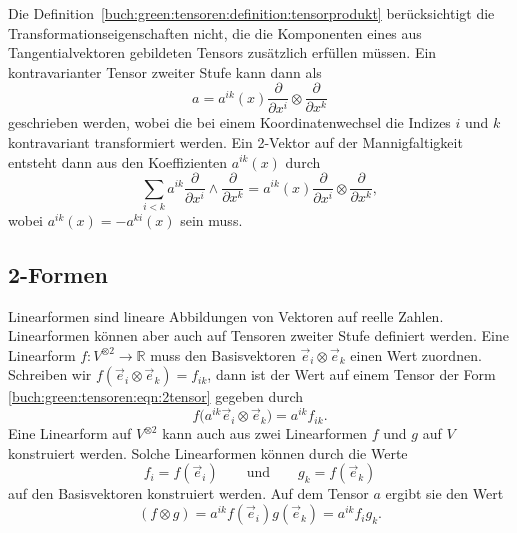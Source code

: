 Die Definition~\ref{buch:green:tensoren:definition:tensorprodukt}
berücksichtigt die Transformationseigenschaften nicht,
die die Komponenten eines aus Tangentialvektoren gebildeten
Tensors zusätzlich erfüllen müssen.
Ein kontravarianter Tensor zweiter Stufe kann dann als
\[
a
=
a^{ik}(x) \frac{\partial}{\partial x^i}\otimes\frac{\partial}{\partial x^k}
\]
geschrieben werden, wobei die bei einem Koordinatenwechsel die
Indizes $i$ und $k$ kontravariant transformiert werden.
Ein 2-Vektor auf der Mannigfaltigkeit entsteht dann aus den Koeffizienten
$a^{ik}(x)$ durch
\[
\sum_{i<k}
a^{ik}
\frac{\partial}{\partial x^i}
\wedge
\frac{\partial}{\partial x^k}
=
a^{ik}(x)
\frac{\partial}{\partial x^i}
\otimes
\frac{\partial}{\partial x^k},
\]
wobei $a^{ik}(x)=-a^{ki}(x)$ sein muss.

%
%
\subsection{2-Formen}
Linearformen sind lineare Abbildungen von Vektoren auf reelle Zahlen.
Linearformen können aber auch auf Tensoren zweiter Stufe definiert werden.
Eine Linearform $f\colon V^{\otimes 2}\to\mathbb{R}$ muss den Basisvektoren
$\vec{e}_i\otimes\vec{e}_k$ einen Wert zuordnen.
Schreiben wir $f(\vec{e}_i\otimes\vec{e}_k)=f_{ik}$, dann ist der Wert
auf einem Tensor der Form
\eqref{buch:green:tensoren:eqn:2tensor}
gegeben durch
\[
f\bigl(
a^{ik}\vec{e}_i\otimes \vec{e}_k
\bigr)
=
a^{ik}
f_{ik}.
\]
Eine Linearform auf $V^{\otimes 2}$ kann auch aus zwei Linearformen
$f$ und $g$ auf $V$ konstruiert werden.
Solche Linearformen können durch die Werte
\[
f_i = f(\vec{e}_i) 
\qquad\text{und}\qquad
g_k = f(\vec{e}_k)
\]
auf den Basisvektoren konstruiert werden.
Auf dem Tensor $a$ ergibt sie den Wert
\[
(f\otimes g)
=
a^{ik}f(\vec{e}_i)g(\vec{e}_k)
=
a^{ik}f_ig_k.
\]

